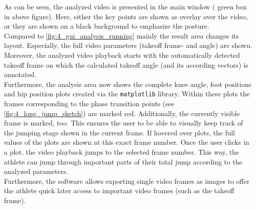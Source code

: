 \FloatBarrier
\noindent As can be seen, the analyzed video is presented in the main window (
green box in above figure).
Here, either the key points are shown as overlay over the video, or they are
shown on a black background to emphasize the posture.\\
Compared to \autoref{fig:4_gui_analysis_running} mainly the result area
changes its layout.
Especially, the full video parameters (takeoff frame- and angle) are
shown.
Moreover, the analyzed video playback starts with the automatically detected
takeoff frame on which the calculated takeoff angle (and its according
vectors) is annotated.\\
Furthermore, the analysis area now shows the complete knee angle, foot
positions and hip position plots created via the \texttt{matplotlib}
library.
Within these plots the frames corresponding to the phase transition points
(see \autoref{fig:4_long_jump_sketch}) are marked red.
Additionally, the currently visible frame is marked, too.
This ensures the user to be able to visually keep track of the jumping stage
shown in the current frame.
If hovered over plots, the full values of the plots are shown at this exact
frame number.
Once the user clicks in a plot, the video playback jumps to the selected frame
number.
This way, the athlete can jump through important parts of their total jump
according to the analyzed parameters.\\
Furthermore, the software allows exporting single video frames as images to
offer the athlete quick later access to important video frames (such as the
takeoff frame).\\\\

